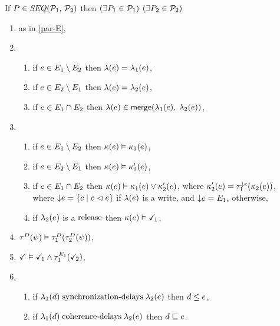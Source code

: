 \begin{definition}
  If $\aPS \in \sSEMI{\aPSS_1}{\aPSS_2}$ then
  $(\exists P_1\in\mathcal{P}_1)$ $(\exists P_2\in\mathcal{P}_2)$
  \begin{enumerate}[topsep=0pt,label=(\textsc{s}\arabic*),ref=\textsc{s}\arabic*]
  \item as in \ref{par-E},
  \item[]  
    \begin{enumerate}[leftmargin=0pt]
    \item \label{seq-lambda1}
      if $e\in E_1\setminus E_2$ then $\lambda(e)=\lambda_1(e)$,
    \item \label{seq-lambda2}
      if $e\in E_2\setminus E_1$ then $\lambda(e)=\lambda_2(e)$,
    \item \label{seq-lambda12}
      if $e\in E_1\cap E_2$ then $\labeling(\aEv)\in \fmerge{\labeling_1(\aEv)}{\labeling_2(\aEv)}$,
    \end{enumerate}
  \item[]  
    \begin{enumerate}[leftmargin=0pt]
    \item \label{seq-kappa1}
      if $e\in E_1\setminus E_2$ then $\kappa(e) \mathrel{\vDash} \kappa_1(e)$,
    \item \label{seq-kappa2}
      if $e\in E_2\setminus E_1$ then $\kappa(e) \mathrel{\vDash} \kappa'_2(e)$,
    \item \label{seq-kappa12}
      if $e\in E_1\cap E_2$ then $\kappa(e) \mathrel{\vDash} \kappa_1(e)\lor\kappa'_2(e)$,
      where
      $\labelingForm'_2(\aEv)=\aTr[1]{\Cdown{\aEv}}{\labelingForm_2(\aEv})$,\\
      where $\smash{\downarrow}e=\{ c \mid c \vartriangleleft e \}$ if $\lambda(e)$ is a write,
      and $\smash{\downarrow}e=E_1$, otherwise,
    \item \label{seq-release}
      if $\lambda_2(e)$ is a $\mathrel{\textnormal{{release}}}$ then $\labelingForm(\aEv) \rimplies \aTerm[1]$,
    \end{enumerate}
  \item \label{seq-tau}
    $\aTr{\bEvs}{\bForm} \rimplies \aTr[1]{\bEvs}{\aTr[2]{\bEvs}{\bForm}}$,
  \item \label{seq-term}
    $\aTerm \rimplies \aTerm[1]\land\aTr[1]{\aEvs_1}{\aTerm[2]}$,
  \item[]  
    \begin{enumerate}[leftmargin=0pt]
    \item \label{seq-delay-sync}
      if 
      $\lambda_1(d)\mathrel{\textnormal{{synchronization-delays}}}\lambda_2(e)$ then $d\le e$,
    \item \label{seq-delay-co}
      if 
      $\lambda_1(d)\mathrel{\textnormal{{coherence-delays}}}\lambda_2(e)$ then $d\sqsubseteq e$.
    \end{enumerate}
  \end{enumerate}
  \medskip


\end{definition}
